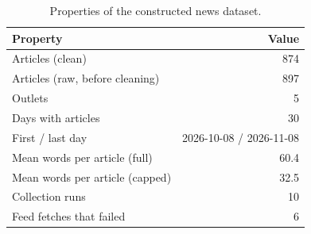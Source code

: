 \begin{table}[t]
\centering
\small
\begin{tabular}{lr}
\hline
Property & Value \\
\hline
Articles (clean) & 874 \\
Articles (raw, before cleaning) & 897 \\
Outlets & 5 \\
Days with articles & 30 \\
First / last day & 2026-10-08 / 2026-11-08 \\
Mean words per article (full) & 60.4 \\
Mean words per article (capped) & 32.5 \\
Collection runs & 10 \\
Feed fetches that failed & 6 \\
\hline
\end{tabular}
\caption{Properties of the constructed news dataset.}
\label{tab:dataset}
\end{table}
